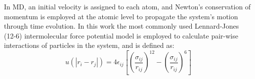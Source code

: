 \documentclass[preprint,12pt]{elsarticle}
\newcommand{\Nkimnote}[1]{ {\textcolor{blue} { ***NKim: #1 }}}
\newcommand{\Nkimnote}[1]{}
\begin{document}


In MD, an initial velocity is assigned to each atom, and Newton's conservation of momentum is employed at the atomic level to propagate the system's motion through time evolution. In this work the most commonly used Lennard-Jones (12-6) intermolecular force potential model is employed to calculate pair-wise interactions of particles in the system, and is defined as: 
\vspace{-.2em}
\begin{equation}
 u(|r_{i} - r_{j}|) = 4\epsilon_{ij}[(\frac{\sigma_{ij}}{r_{ij}})^{12}-(\frac{\sigma_{ij}}{r_{ij}})^{6}]
 \label{eq:LJ12}
\end{equation}
\normalsize


\end{document}
